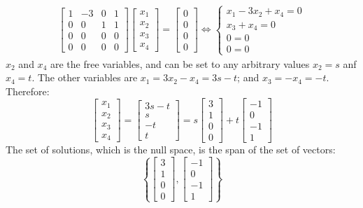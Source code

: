 \documentclass{article}
\begin{document}
\begin{itemize}
\begin{align*}
\begin{bmatrix}
1 & -3 & 0 & 1 \\
0 &  0 & 1 & 1 \\
0 &  0 & 0 & 0 \\ 
0 &  0 & 0 & 0
\end{bmatrix}\begin{bmatrix} x_1 \\ x_2 \\ x_3 \\ x_4 \end{bmatrix} = \begin{bmatrix} 0 \\ 0 \\ 0 \\ 0 \end{bmatrix} 
\iff \left\{\begin{array}{c}
x_1 - 3x_2 + x_4 = 0 \\ 
x_3 + x_4 = 0 \\ 
0 = 0 \\ 
0 = 0 
\end{array}\right.
\end{align*}
\(x_2\) and \(x_4\) are the free variables, and can be set to any arbitrary values \(x_2 = s\) anf \(x_4 = t\). The other variables are \(x_1 = 3x_2 - x_4 = 3s - t\); and \(x_3 = -x_4 = -t\). Therefore:
\[\begin{bmatrix} x_1 \\ x_2 \\ x_3 \\ x_4 \end{bmatrix} = \begin{bmatrix} 3s - t \\ s \\ -t \\ t \end{bmatrix} = s\begin{bmatrix} 3 \\ 1 \\ 0 \\ 0 \end{bmatrix} + t\begin{bmatrix} -1 \\ 0 \\ -1 \\ 1 \end{bmatrix}\]
The set of solutions, which is the null space, is the span of the set of vectors:
\[\left\{\begin{bmatrix} 3 \\ 1 \\ 0 \\ 0 \end{bmatrix}, \begin{bmatrix} -1 \\ 0 \\ -1 \\ 1 \end{bmatrix}\right\}\] 

\end{itemize}
\end{document}
